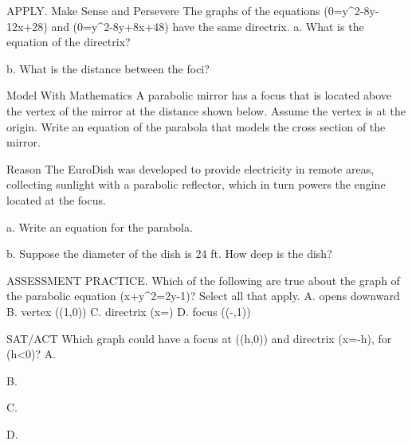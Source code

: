\documentclass{article}
\newenvironment{practice}[2]{}{}        %
\newcommand{\answer}[1]{}               %
\newcommand{\placeholder}[2]{}          %
\begin{document}
\begin{practice}{22}{2}
APPLY. Make Sense and Persevere The graphs of the equations (0=y^2-8y-12x+28) and (0=y^2-8y+8x+48) have the same directrix.
a. What is the equation of the directrix?
\answer{(x=-2)}
b. What is the distance between the foci?
\answer{10 units}
\end{practice}
\begin{practice}{23}{3}
Model With Mathematics A parabolic mirror has a focus that is located above the vertex of the mirror at the distance shown below. Assume the vertex is at the origin. Write an equation of the parabola that models the cross section of the mirror.
\placeholder{photo}{Parabolic mirror with a marked focus F above its vertex and a vertical bracket labeled 3 in. measuring vertex-to-focus distance.}
\answer{(y=\frac{1}{12}x^2)}
\end{practice}
\begin{practice}{24}{3}
Reason The EuroDish was developed to provide electricity in remote areas, collecting sunlight with a parabolic reflector, which in turn powers the engine located at the focus.
\placeholder{photo}{EuroDish parabolic solar reflector outdoors. Callout Engine points to the receiver at upper left; Vertex: (0,0) points to center of dish at right. White double-arrow segment from vertex to engine is labeled 12 ft.}
a. Write an equation for the parabola.
\answer{Answers may vary. Sample: (y=\frac{1}{48}x^2)}
b. Suppose the diameter of the dish is 24 ft. How deep is the dish?
\answer{3 feet}
\end{practice}
\begin{practice}{25}{2}
ASSESSMENT PRACTICE. Which of the following are true about the graph of the parabolic equation (x+y^2=2y-1)? Select all that apply.
A. opens downward
B. vertex ((1,0))
C. directrix (x=)
D. focus ((-,1))
\answer{C, D}
\end{practice}
\begin{practice}{26}{2}
SAT/ACT Which graph could have a focus at ((h,0)) and directrix (x=-h), for (h<0)?
A.
\placeholder{graph}{Choice A: black double-arrow x and y axes without ticks or grid, red left-opening parabola whose vertex is right of the origin on the x-axis; arrowheads on both ends at left.}
B.
\placeholder{graph}{Choice B: black double-arrow x and y axes without ticks or grid, red right-opening parabola whose vertex is right of the origin on the x-axis; arrowheads on both ends at right.}
C.
\placeholder{graph}{Choice C: black double-arrow x and y axes without ticks or grid, red left-opening parabola with vertex at the origin; arrowheads on both ends at left.}
D.
\placeholder{graph}{Choice D: black double-arrow x and y axes without ticks or grid, red right-opening parabola with vertex at the origin; arrowheads on both ends at right.}
\answer{C}
\end{practice}
\end{document}
